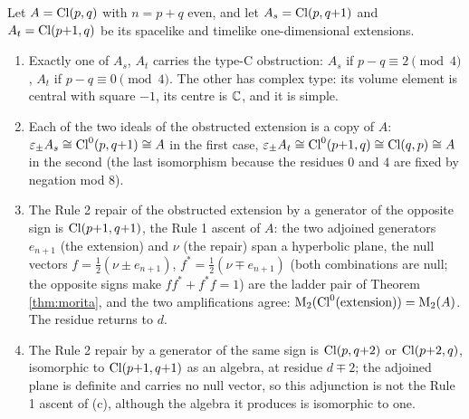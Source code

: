 \begin{theorem}\label{thm:extension}
Let $A = \mathrm{Cl}(p,q)$ with $n = p + q$ even, and let $A_s = \mathrm{Cl}(p,q{+}1)$ and $A_t = \mathrm{Cl}(p{+}1,q)$ be its spacelike and timelike one-dimensional extensions.
\begin{enumerate}
\item[(a)] Exactly one of $A_s$, $A_t$ carries the type-C obstruction: $A_s$ if $p - q \equiv 2 \pmod 4$, $A_t$ if $p - q \equiv 0 \pmod 4$. The other has complex type: its volume element is central with square $-1$, its centre is $\mathbb{C}$, and it is simple.
\item[(b)] Each of the two ideals of the obstructed extension is a copy of $A$: $\varepsilon_\pm A_s \cong \mathrm{Cl}^0(p,q{+}1) \cong A$ in the first case, $\varepsilon_\pm A_t \cong \mathrm{Cl}^0(p{+}1,q) \cong \mathrm{Cl}(q,p) \cong A$ in the second (the last isomorphism because the residues $0$ and $4$ are fixed by negation mod $8$).
\item[(c)] The Rule 2 repair of the obstructed extension by a generator of the opposite sign is $\mathrm{Cl}(p{+}1,q{+}1)$, the Rule 1 ascent of $A$: the two adjoined generators $e_{n+1}$ (the extension) and $\nu$ (the repair) span a hyperbolic plane, the null vectors $f = \tfrac12(\nu \pm e_{n+1})$, $f^* = \tfrac12(\nu \mp e_{n+1})$ (both combinations are null; the opposite signs make $ff^* + f^*f = 1$) are the ladder pair of Theorem \ref{thm:morita}, and the two amplifications agree: $\mathrm{M}_2(\mathrm{Cl}^0(\text{extension})) = \mathrm{M}_2(A)$. The residue returns to $d$.
\item[(d)] The Rule 2 repair by a generator of the same sign is $\mathrm{Cl}(p,q{+}2)$ or $\mathrm{Cl}(p{+}2,q)$, isomorphic to $\mathrm{Cl}(p{+}1,q{+}1)$ as an algebra, at residue $d \mp 2$; the adjoined plane is definite and carries no null vector, so this adjunction is not the Rule 1 ascent of (c), although the algebra it produces is isomorphic to one.
\end{enumerate}
\end{theorem}


